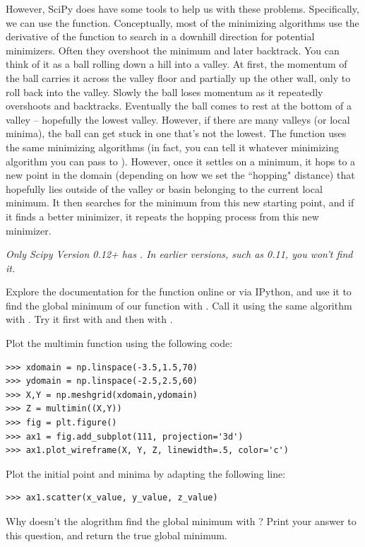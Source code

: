However, SciPy does have some tools to help us with these problems. 
Specifically, we can use the  function.
Conceptually, most of the minimizing algorithms use the derivative of the function to search in a downhill direction for potential minimizers.
Often they overshoot the minimum and later backtrack. 
You can think of it as a ball rolling down a hill into a valley.
At first, the momentum of the ball carries it across the valley floor and partially up the other wall, only to roll back into the valley.
Slowly the ball loses momentum as it repeatedly overshoots and backtracks. 
Eventually the ball comes to rest at the bottom of a valley -- hopefully the lowest valley.
However, if there are many valleys (or local minima), the ball can get stuck in one that's not the lowest.
The  function uses the same minimizing algorithms (in fact, you can tell it whatever minimizing algorithm you can pass to ).
However, once it settles on a minimum, it hops to a new point in the domain (depending on how we set the ``hopping" distance) that hopefully lies outside of the valley
or basin belonging to the current local minimum.
It then searches for the minimum from this new starting point, and if it finds a better minimizer, it repeats the hopping process from this new minimizer.

\emph{Only Scipy Version 0.12+ has . In earlier versions, such as 0.11, you won't find it.}

\begin{problem}
Explore the documentation for the  function online or via IPython, and use it to find the global minimum of our  function with .
Call it using the same  algorithm with .
Try it first with  and then with . 

Plot the multimin function using the following code:
\begin{lstlisting}
>>> xdomain = np.linspace(-3.5,1.5,70)
>>> ydomain = np.linspace(-2.5,2.5,60)
>>> X,Y = np.meshgrid(xdomain,ydomain)
>>> Z = multimin((X,Y))
>>> fig = plt.figure()
>>> ax1 = fig.add_subplot(111, projection='3d')
>>> ax1.plot_wireframe(X, Y, Z, linewidth=.5, color='c')
\end{lstlisting}

Plot the initial point and minima by adapting the following line:
\begin{lstlisting}
>>> ax1.scatter(x_value, y_value, z_value)     
\end{lstlisting}

Why doesn't the alogrithm find the global minimum with ?
Print your answer to this question, and return the true global minimum.
\end{problem}

